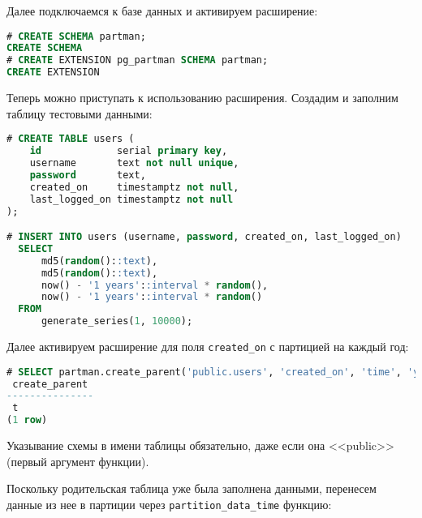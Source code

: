 Далее подключаемся к базе данных и активируем расширение:

\begin{lstlisting}[language=SQL,label=lst:pgpartman4,caption=Настройка расширения]
# CREATE SCHEMA partman;
CREATE SCHEMA
# CREATE EXTENSION pg_partman SCHEMA partman;
CREATE EXTENSION
\end{lstlisting}

Теперь можно приступать к использованию расширения. Создадим и заполним таблицу тестовыми данными:

\begin{lstlisting}[language=SQL,label=lst:pgpartman5,caption=Данные]
# CREATE TABLE users (
    id             serial primary key,
    username       text not null unique,
    password       text,
    created_on     timestamptz not null,
    last_logged_on timestamptz not null
);

# INSERT INTO users (username, password, created_on, last_logged_on)
  SELECT
      md5(random()::text),
      md5(random()::text),
      now() - '1 years'::interval * random(),
      now() - '1 years'::interval * random()
  FROM
      generate_series(1, 10000);
\end{lstlisting}

Далее активируем расширение для поля \lstinline!created_on! с партицией на каждый год:

\begin{lstlisting}[language=SQL,label=lst:pgpartman6,caption=Партицирование]
# SELECT partman.create_parent('public.users', 'created_on', 'time', 'yearly');
 create_parent
---------------
 t
(1 row)
\end{lstlisting}

Указывание схемы в имени таблицы обязательно, даже если она <<public>> (первый аргумент функции).

Поскольку родительская таблица уже была заполнена данными, перенесем данные из нее в партиции через \lstinline!partition_data_time! функцию:

